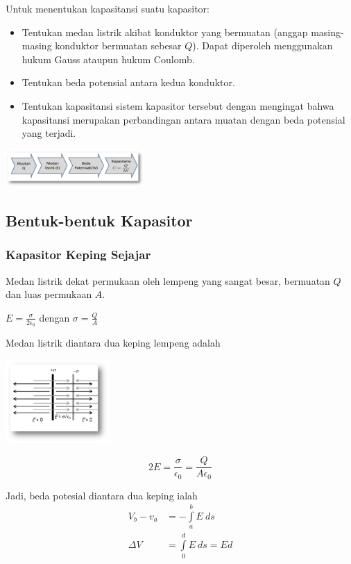 \documentclass[twocolumn, 11pt]{article}%
\begin{document}
    Untuk menentukan kapasitansi suatu kapasitor:
    \begin{itemize}
        \item Tentukan medan listrik akibat konduktor yang bermuatan (anggap masing-masing konduktor bermuatan sebesar $Q$). Dapat diperoleh menggunakan hukum Gauss ataupun hukum Coulomb.
        \item Tentukan beda potensial antara kedua konduktor.
        \item Tentukan kapasitansi sistem kapasitor tersebut dengan mengingat bahwa kapasitansi merupakan perbandingan antara muatan dengan beda potensial yang terjadi.
    \end{itemize}

    \begin{center}
        \includegraphics[width=200px]{1.png}
    \end{center}

    \subsection{Bentuk-bentuk Kapasitor}%
    \subsubsection{Kapasitor Keping Sejajar}%
    Medan listrik dekat permukaan oleh lempeng yang sangat besar, bermuatan $Q$ dan luas permukaan $A$.
    \begin{center}
        $\displaystyle E=\frac{\sigma}{2\epsilon_0}$ dengan $\displaystyle \sigma = \frac{Q}A$
    \end{center}

    Medan listrik diantara dua keping lempeng adalah
    \begin{center}
        \includegraphics[width=150px]{4.png}
    \end{center}
    \[2E=\frac{\sigma}{\epsilon_0}=\frac{Q}{A\epsilon_0} \]

    Jadi, beda potesial diantara dua keping ialah
    \begin{align*}
        V_b-v_a&=-\int\limits_a^b E\ ds\\
        \Delta V&=\int\limits_0^d E\ ds=Ed
    \end{align*}
\end{document}
